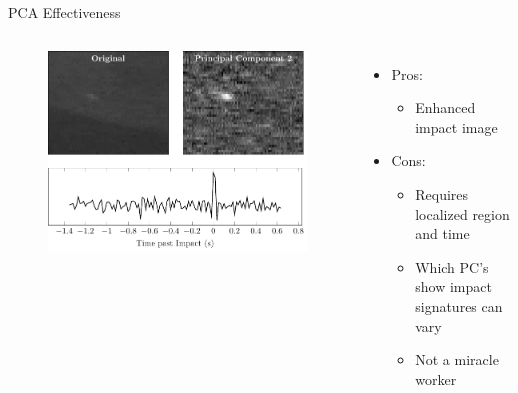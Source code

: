 \documentclass[pdf]{beamer}
\begin{document}
 \begin{frame}{PCA Effectiveness}
   \begin{columns}
	 \begin{figure}[ht!]
	   \centering
	   \includegraphics[width=\textwidth]{Images/pca_example2.pdf}
	 \end{figure}
	 \begin{itemize}
	   \item Pros:
		 \begin{itemize}
		   \item Enhanced impact image
		 \end{itemize}
	   \item Cons:
		 \begin{itemize}
		   \item Requires localized region and time
		   \item Which PC's show impact signatures can vary
		   \item Not a miracle worker
		 \end{itemize}
	 \end{itemize}
   \end{columns}
 \end{frame}
\end{document}
